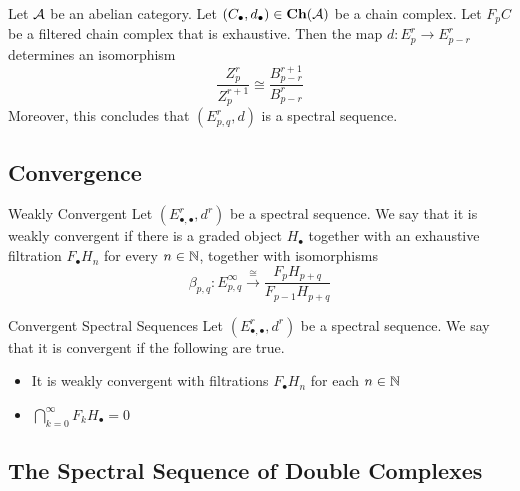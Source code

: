 \documentclass[a4paper]{article}
\begin{document}
\begin{thm}{}{} Let $\mathcal{A}$ be an abelian category. Let $(C_\bullet,d_\bullet)\in\bold{Ch}(\mathcal{A})$ be a chain complex. Let $F_pC$ be a filtered chain complex that is exhaustive. Then the map $d:E_p^r\to E_{p-r}^r$ determines an isomorphism $$\frac{Z_p^r}{Z_p^{r+1}}\cong\frac{B_{p-r}^{r+1}}{B_{p-r}^r}$$ Moreover, this concludes that $(E_{p,q}^r,d)$ is a spectral sequence. 
\end{thm}

\subsection{Convergence}
\begin{defn}{Weakly Convergent}{} Let $(E_{\bullet,\bullet}^r,d^r)$ be a spectral sequence. We say that it is weakly convergent if there is a graded object $H_\bullet$ together with an exhaustive filtration $F_\bullet H_n$ for every $n\in\mathbb{N}$, together with isomorphisms $$\beta_{p,q}:E_{p,q}^\infty\overset{\cong}{\longrightarrow}\frac{F_pH_{p+q}}{F_{p-1}H_{p+q}}$$
\end{defn}

\begin{defn}{Convergent Spectral Sequences}{} Let $(E_{\bullet,\bullet}^r,d^r)$ be a spectral sequence. We say that it is convergent if the following are true. 
\begin{itemize}
\item It is weakly convergent with filtrations $F_\bullet H_n$ for each $n\in\mathbb{N}$
\item $\bigcap_{k=0}^\infty F_kH_\bullet=0$
\end{itemize}
\end{defn}


\subsection{The Spectral Sequence of Double Complexes}
\end{document}
